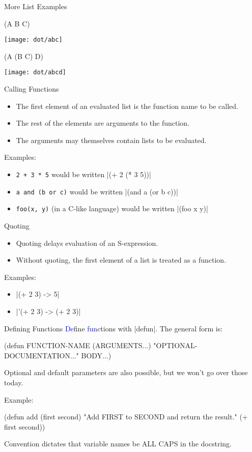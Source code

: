 \documentclass{beamer}
\newcommand{\blue}[1]{\textcolor{blue}{#1}}
\begin{document}

\begin{frame}[fragile]{More List Examples}
  \begin{clcode}
    (A B C)
  \end{clcode}
\texttt{[image: dot/abc]}
\begin{clcode}
  (A (B C) D)
\end{clcode}
\texttt{[image: dot/abcd]}
\end{frame}

\begin{frame}{Calling Functions}
\begin{itemize}
\item The first element of an evaluated list is the function name to be called.
\item The rest of the elements are arguments to the function.
\item The arguments may themselves contain lists to be evaluated.
\end{itemize}
Examples:
\begin{itemize}
\item \texttt{2 + 3 * 5} would be written \cl|(+ 2 (* 3 5))|
\item \texttt{a and (b or c)} would be written \cl|(and a (or b c))|
\item \texttt{foo(x, y)} (in a C-like language) would be written \cl|(foo x y)|
\end{itemize}
\end{frame}

\begin{frame}{Quoting}
  \begin{itemize}
  \item Quoting delays evaluation of an S-expression.
  \item Without quoting, the first element of a list is treated as a function.
  \end{itemize}
Examples:
\begin{itemize}
\item \cl|(+ 2 3) -> 5|
\item \cl|'(+ 2 3) -> (+ 2 3)|
\end{itemize}
\end{frame}

\begin{frame}[fragile]{Defining Functions}
\blue{De}fine \blue{fun}ctions with \cl|defun|. The general form is:
\begin{clcode}
(defun FUNCTION-NAME (ARGUMENTS...)
  "OPTIONAL-DOCUMENTATION..."
  BODY...)
\end{clcode}
Optional and default parameters are also possible, but we won't go over those today.

Example:
\begin{clcode}
(defun add (first second)
  "Add FIRST to SECOND and return the result."
  (+ first second))
\end{clcode}
Convention dictates that variable names be ALL CAPS in the docstring.
\end{frame}
\end{document}
